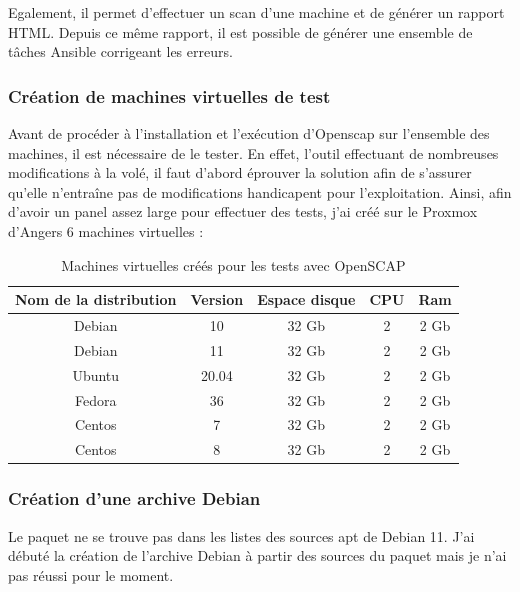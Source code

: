 \documentclass[12pt]{article}
\begin{document}
Egalement, il permet d'effectuer un scan d'une machine et de générer un rapport HTML.
Depuis ce même rapport, il est possible de générer une ensemble de tâches Ansible corrigeant les erreurs.

\subsubsection{Création de machines virtuelles de test}
Avant de procéder à l'installation et l'exécution d'Openscap sur l'ensemble des machines, il est nécessaire de le tester. En effet, l'outil effectuant de nombreuses modifications à la volé, il faut d'abord éprouver la solution afin de s'assurer qu'elle n'entraîne pas de modifications handicapent pour l'exploitation.
Ainsi, afin d'avoir un panel assez large pour effectuer des tests, j'ai créé sur le Proxmox d'Angers 6 machines virtuelles :
\begin{table}[ht!]
    \begin{center}
        \begin{tabular}{| c | c | c | c | c |}
        \hline
        Nom de la distribution & Version & Espace disque & CPU & Ram 
        \tabularnewline

        \hline
        Debian & 10 & 32 Gb & 2 & 2 Gb
        \tabularnewline

        \hline
        Debian & 11 & 32 Gb & 2 & 2 Gb
        \tabularnewline

        \hline
        Ubuntu & 20.04 & 32 Gb & 2 & 2 Gb
        \tabularnewline

        \hline
        Fedora & 36 & 32 Gb & 2 & 2 Gb
        \tabularnewline

        \hline
        Centos & 7 & 32 Gb & 2 & 2 Gb
        \tabularnewline

        \hline
        Centos & 8 & 32 Gb & 2 & 2 Gb
        \tabularnewline
        \hline
        \end{tabular}
    \end{center}
    \caption{Machines virtuelles créés pour les tests avec OpenSCAP}
\end{table}

\subsubsection{Création d'une archive Debian}
Le paquet ne se trouve pas dans les listes des sources apt de Debian 11. 
J'ai débuté la création de l'archive Debian à partir des sources du paquet mais je n'ai pas réussi pour le moment.
\end{document}
